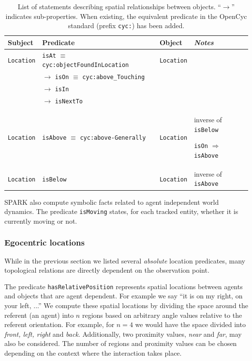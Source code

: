 \documentclass{svmult}
\newcommand{\concept}[1]{{\footnotesize \texttt{#1}}}
\begin{document}
\begin{table}[h]
    \centering
    \begin{tabular}{p{1.5cm}p{5cm}p{2cm}p{2.7cm}}
	\rowcolor{white}
    \textbf{Subject} & \textbf{Predicate} & \textbf{Object} & \emph{Notes} \\ 
    \hline
	 \concept{Location} & \concept{isAt} $\equiv$ \concept{cyc:objectFoundInLocation}  &  \concept{Location} & \\ 
	 &  $\rightarrow$ \concept{isOn} $\equiv$ \concept{cyc:above\_Touching}  &  & \\ 
	 &  $\rightarrow$ \concept{isIn}  &  & \\ 
	 &  $\rightarrow$ \concept{isNextTo}  & &  \\ 
	 \concept{Location}  & \concept{isAbove} $\equiv$ \concept{cyc:above-Generally}  &  \concept{Location}  &  inverse of \concept{isBelow} \par \concept{isOn} $\Rightarrow$ \concept{isAbove}\\ 
	 \concept{Location}  & \concept{isBelow}  & \concept{Location}  &  inverse of \concept{isAbove}
	\end{tabular}

	\caption{List of statements describing spatial relationships between
	objects. ``$\rightarrow$'' indicates sub-properties. When existing, the
	equivalent predicate in the {\sc OpenCyc} standard (prefix \concept{cyc:})
	has been added.}

\label{facts|sprelations}
\end{table}

SPARK also compute symbolic facts related to agent independent world dynamics.
The predicate \concept{isMoving} states, for each tracked entity, whether it is
currently moving or not.


\subsubsection{Egocentric locations}

While in the previous section we listed several \emph{absolute} location
predicates, many topological relations are directly dependent on the
observation point.

The predicate \concept{hasRelativePosition} represents spatial locations
between agents and objects that are agent dependent.  For example we say ``it
is on my right, on your left, ...'' We compute these spatial locations by
dividing the space around the referent (an agent) into $n$ regions based on
arbitrary angle values relative to the referent orientation.  For example, for
$n = 4$ we would have the space divided into \emph{front, left, right} and
\emph{back}. Additionally, two proximity values, \emph{near} and \emph{far},
may also be considered. The number of regions and proximity values can be
chosen depending on the context where the interaction takes place.
\end{document}
